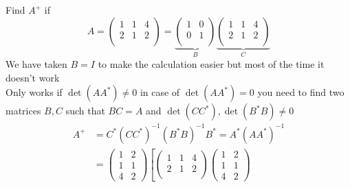 \begin{example}
        Find $A^{+}$ if 
        \[
        A = \begin{pmatrix}
                1 & 1 & 4\\
                2 & 1 & 2\\
            \end{pmatrix} 
            = 
            \underbrace{
                \begin{pmatrix}
                        1 & 0\\
                        0 & 1\\
                    \end{pmatrix}
            }_B
            \underbrace{
                \begin{pmatrix}
                        1 & 1 & 4\\
                        2 & 1 & 2\\
                    \end{pmatrix} 
            }_C
        \]
We have taken $B = I$ to make the calculation easier but most of the time it doesn't work 
\\
Only works if $\det(AA^{*}) \neq 0$ in case of $\det(AA^{*}) = 0$ you need to find two matrices $B,C$ such that
$BC = A$ and $\det(CC^{*}) , \det(B^{*}B) \neq 0$
        \begin{align*}
                A^{+} &=  C^{*}(CC^{*})^{-1} (B^{*}B)^{-1}B^{*} =  A^{*}(AA^{*})^{-1}
                \\
                &=
                \begin{pmatrix}
                        1 & 2\\
                        1 & 1\\
                        4 & 2
                    \end{pmatrix} 
                \left[
                        \begin{pmatrix}
                                1 & 1 & 4\\
                                2 & 1 & 2\\
                        \end{pmatrix} 
                        \begin{pmatrix}
                                1 & 2\\
                                1 & 1\\
                                4 & 2
                        \end{pmatrix}   

\end{align*}
\end{example}
